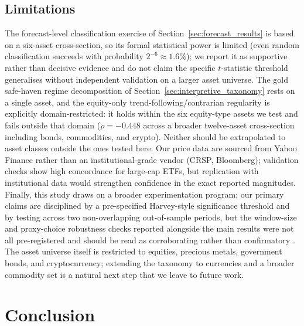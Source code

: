 \subsection{Limitations}
\label{sec:limitations}

The forecast-level classification exercise of Section~\ref{sec:forecast_results} is based on a six-asset cross-section, so its formal statistical power is limited (even random classification succeeds with probability $2^{-6}\approx1.6\%$); we report it as supportive rather than decisive evidence and do not claim the specific $t$-statistic threshold generalises without independent validation on a larger asset universe. The gold safe-haven regime decomposition of Section~\ref{sec:interpretive_taxonomy} rests on a single asset, and the equity-only trend-following/contrarian regularity is explicitly domain-restricted: it holds within the six equity-type assets we test and fails outside that domain ($\rho=-0.448$ across a broader twelve-asset cross-section including bonds, commodities, and crypto). Neither should be extrapolated to asset classes outside the ones tested here. Our price data are sourced from Yahoo Finance rather than an institutional-grade vendor (CRSP, Bloomberg); validation checks show high concordance for large-cap ETFs, but replication with institutional data would strengthen confidence in the exact reported magnitudes. Finally, this study draws on a broader experimentation program; our primary claims are disciplined by a pre-specified Harvey-style significance threshold and by testing across two non-overlapping out-of-sample periods, but the window-size and proxy-choice robustness checks reported alongside the main results were not all pre-registered and should be read as corroborating rather than confirmatory \citep{harvey2016}. The asset universe itself is restricted to equities, precious metals, government bonds, and cryptocurrency; extending the taxonomy to currencies and a broader commodity set is a natural next step that we leave to future work.


\section{Conclusion}\label{sec:conclusion}

